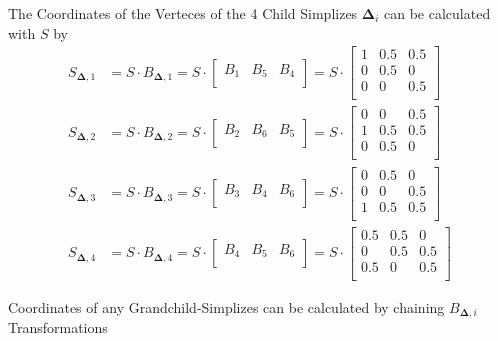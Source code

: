 \documentclass{mitschrift}
\newcommand{\simplex}{\boldsymbol{\Delta}}
\begin{document}
The Coordinates of the Verteces of the 4 Child Simplizes $\simplex_i$ can be calculated with $S$ by \begin{align}
    S_{\simplex,1} &= S \cdot B_{\simplex,1} = S \cdot \begin{bmatrix}
        B_1 & B_5 & B_4 \\
    \end{bmatrix} = S \cdot \begin{bmatrix}
        1 & 0.5 & 0.5 \\
        0 & 0.5 & 0 \\
        0 & 0 & 0.5 \\
    \end{bmatrix} \\
    S_{\simplex,2} &= S \cdot B_{\simplex,2} = S \cdot \begin{bmatrix}
        B_2 & B_6 & B_5 \\
    \end{bmatrix} = S \cdot \begin{bmatrix}
        0 & 0   & 0.5 \\
        1 & 0.5 & 0.5 \\
        0 & 0.5 & 0   \\
    \end{bmatrix} \\
    S_{\simplex,3} &= S \cdot B_{\simplex,3} = S \cdot \begin{bmatrix}
        B_3 & B_4 & B_6 \\
    \end{bmatrix} = S \cdot \begin{bmatrix}
        0 & 0.5 & 0   \\
        0 & 0   & 0.5 \\
        1 & 0.5 & 0.5 \\
    \end{bmatrix} \\
    S_{\simplex,4} &= S \cdot B_{\simplex,4} = S \cdot \begin{bmatrix}
        B_4 & B_5 & B_6 \\
    \end{bmatrix} = S \cdot \begin{bmatrix}
        0.5 & 0.5 & 0   \\
        0   & 0.5 & 0.5 \\
        0.5 & 0   & 0.5 \\
    \end{bmatrix}
\end{align}

Coordinates of any Grandchild-Simplizes can be calculated by chaining $B_{\simplex,i}$ Transformations
\end{document}
